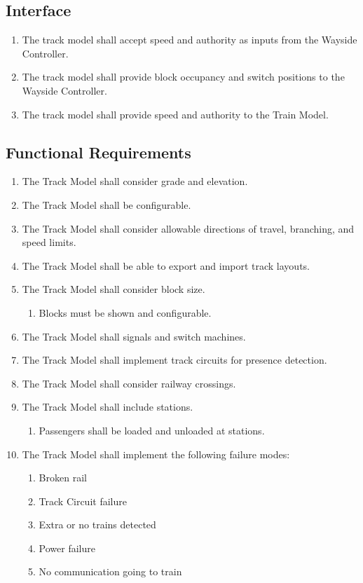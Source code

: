 \documentclass{scrreprt}
\begin{document}
\subsection{Interface}
\begin{enumerate}
    \item The track model shall accept speed and authority as inputs from the Wayside Controller.
    \item The track model shall provide block occupancy and switch positions to the Wayside Controller.
    \item The track model shall provide speed and authority to the Train Model.
\end{enumerate}

\subsection{Functional Requirements}
\begin{enumerate}
    \item The Track Model shall consider grade and elevation.
    \item The Track Model shall be configurable.
    \item The Track Model shall consider allowable directions of travel, branching, and speed limits.
    \item The Track Model shall be able to export and import track layouts.
    \item The Track Model shall consider block size.
    \begin{enumerate}
        \item Blocks must be shown and configurable.
    \end{enumerate}
    \item The Track Model shall signals and switch machines.
    \item The Track Model shall implement track circuits for presence detection.
    \item The Track Model shall consider railway crossings.
    \item The Track Model shall include stations.
    \begin{enumerate}
        \item Passengers shall be loaded and unloaded at stations.
    \end{enumerate}
    \item The Track Model shall implement the following failure modes:
    \begin{enumerate}
        \item Broken rail
        \item Track Circuit failure
        \item Extra or no trains detected
        \item Power failure
        \item No communication going to train
    \end{enumerate}
\end{enumerate}
\end{document}
